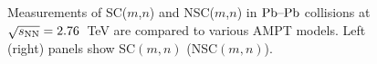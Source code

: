  
 \begin{figure}[!]
	\begin{center}
        \caption{Measurements of SC($m$,$n$) and NSC($m$,$n$) in $\textnormal{Pb--Pb}$ collisions at $\sqrt{s_{\textnormal{NN}}}=2.76$~TeV are compared to various AMPT models. Left (right) panels show SC$(m,n)$ (NSC$(m,n)$).}
        \label{fig:Figure_5}
        \end{center}   
 \end{figure}
 
